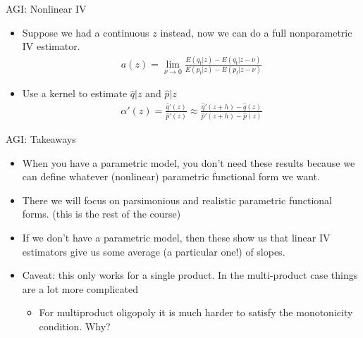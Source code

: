\documentclass[xcolor=pdftex,dvipsnames,table,mathserif]{beamer}
\begin{document}
\begin{frame}{AGI: Nonlinear IV}
\begin{itemize}
\item Suppose we had a continuous $z$ instead, now we can do a full nonparametric IV estimator.
\begin{eqnarray*}
a(z) = \lim_{\nu \rightarrow 0} \frac{E(q_t | z) - E(q_t | z-\nu)}{E(p_t | z) - E(p_t | z- \nu)}
\end{eqnarray*}
\item Use a kernel to estimate $\hat{q}|z$ and $\hat{p}|z$
\begin{eqnarray*}
\alpha'(z) =\frac{\hat{q}'(z)}{\hat{p}'(z)} \approx \frac{\hat{q}'(z+h) - \hat{q}(z)}{\hat{p}'(z+h) - \hat{p}(z)}
\end{eqnarray*}
\end{itemize}
\end{frame}



\begin{frame}{AGI: Takeaways}
\begin{itemize}
\item When you have a parametric model, you don't need these results because we can define whatever (nonlinear) parametric functional form we want.
\item There we will focus on parsimonious and realistic parametric functional forms. (this is the rest of the course)
\item If we don't have a parametric model, then these show us that linear IV estimators give us some average (a particular one!) of slopes.
\item Caveat: this only works for a single product. In the multi-product case things are a lot more complicated
\begin{itemize}
\item For multiproduct oligopoly it is much harder to satisfy the \alert{monotonicity} condition.  Why?
\end{itemize}
\end{itemize}
\end{frame}
\end{document}
